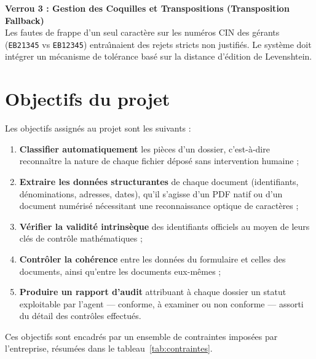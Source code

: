\begin{infobox}
\textbf{Verrou 3 : Gestion des Coquilles et Transpositions (Transposition Fallback)} \\
Les fautes de frappe d'un seul caract\`{e}re sur les num\'{e}ros CIN des g\'{e}rants (\texttt{EB21345} vs \texttt{EB12345}) entra\^{\i}naient des rejets stricts non justifi\'{e}s. Le syst\`{e}me doit int\'{e}grer un m\'{e}canisme de tol\'{e}rance bas\'{e} sur la distance d'\'{e}dition de Levenshtein.
\end{infobox}
 
 \section{Objectifs du projet}

Les objectifs assignés au projet sont les suivants :

\begin{enumerate}[leftmargin=1.6cm,itemsep=3pt,topsep=4pt]
  \item \textbf{Classifier automatiquement} les pièces d'un dossier, c'est-à-dire
        reconnaître la nature de chaque fichier déposé sans intervention humaine ;
  \item \textbf{Extraire les données structurantes} de chaque document
        (identifiants, dénominations, adresses, dates), qu'il s'agisse d'un PDF
        natif ou d'un document numérisé nécessitant une reconnaissance optique de
        caractères ;
  \item \textbf{Vérifier la validité intrinsèque} des identifiants officiels au
        moyen de leurs clés de contrôle mathématiques ;
  \item \textbf{Contrôler la cohérence} entre les données du formulaire et celles
        des documents, ainsi qu'entre les documents eux-mêmes ;
  \item \textbf{Produire un rapport d'audit} attribuant à chaque dossier un statut
        exploitable par l'agent --- conforme, à examiner ou non conforme ---
        assorti du détail des contrôles effectués.
\end{enumerate}

Ces objectifs sont encadrés par un ensemble de contraintes imposées par
l'entreprise, résumées dans le tableau~\ref{tab:contraintes}.

